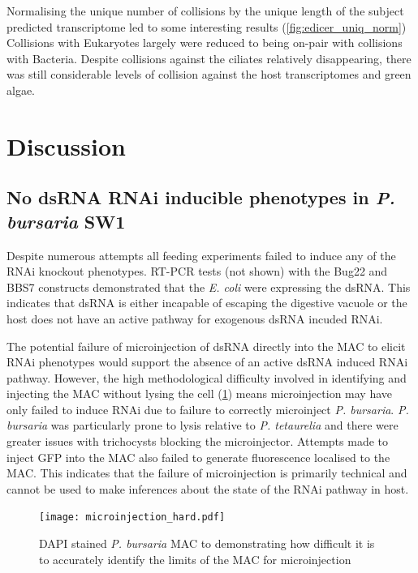 Normalising the unique number of collisions by the unique length of
the subject predicted transcriptome led to some interesting results (\cref{fig:edicer_uniq_norm})
Collisions with Eukaryotes largely were reduced to being on-pair
with collisions with Bacteria. 
Despite collisions against the ciliates relatively disappearing,
there was still considerable levels of collision against
the host transcriptomes and green algae.

\section{Discussion}

\subsection{No dsRNA RNAi inducible phenotypes in \textit{P. bursaria} SW1}

Despite numerous attempts all feeding experiments failed to induce
any of the RNAi knockout phenotypes.  RT-PCR tests (not shown) with the Bug22
and BBS7 constructs demonstrated
that the \textit{E. coli} were expressing the dsRNA.  
This indicates that dsRNA is either incapable of escaping the digestive vacuole
or the host does not have an active pathway for exogenous dsRNA incuded
RNAi.  

The potential failure of microinjection of dsRNA directly into the MAC
to elicit RNAi phenotypes would support the absence
of an active dsRNA induced RNAi pathway. 
However, the high methodological difficulty involved in identifying and injecting
the MAC without lysing the cell (\cref{fig:microinjection_nucleus}) 
means microinjection may have only failed to induce RNAi due to failure
to correctly microinject \textit{P. bursaria}.   \textit{P. bursaria}
was particularly prone to lysis relative to \textit{P. tetaurelia} and
there were greater issues with trichocysts blocking the microinjector. 
Attempts made to inject GFP into the MAC also failed to generate fluorescence
localised to the MAC.  This indicates that the failure of microinjection is
primarily technical and cannot be used to make inferences about the state
of the RNAi pathway in host. 

\begin{figure}
    \texttt{[image: microinjection\_hard.pdf]}
    \caption[DAPI Stained \textit{P. bursaria} MAC]{DAPI stained \textit{P. bursaria}
        MAC to demonstrating how difficult it is to accurately identify the limits
    of the MAC for microinjection}
    \label{fig:microinjection_nucleus}
\end{figure}


